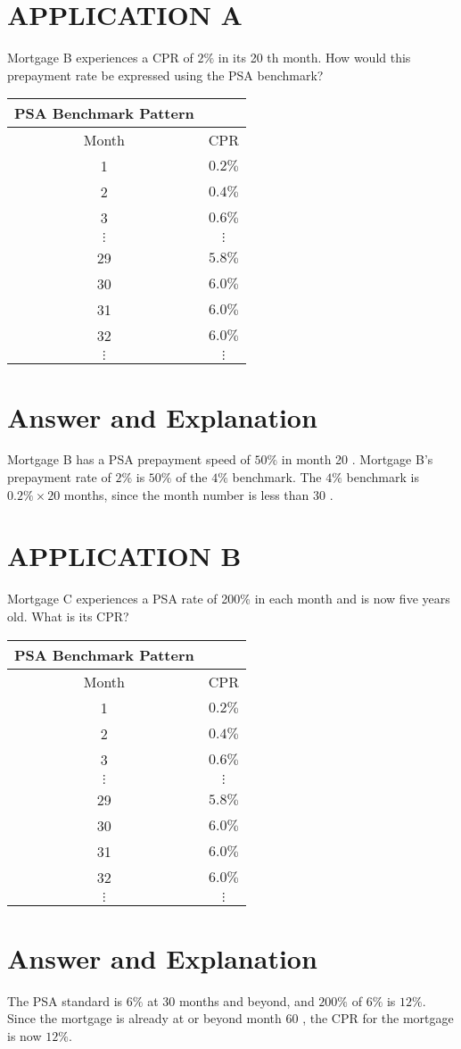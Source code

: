 \documentclass[11pt]{article}
\begin{document}
\section*{APPLICATION A}
Mortgage B experiences a CPR of $2 \%$ in its 20 th month. How would this prepayment rate be expressed using the PSA benchmark?

\begin{center}
\begin{tabular}{|cc|}
\hline
PSA Benchmark Pattern &  \\
\hline
Month & CPR \\
\hline
1 & $0.2 \%$ \\
2 & $0.4 \%$ \\
3 & $0.6 \%$ \\
$\vdots$ & $\vdots$ \\
29 & $5.8 \%$ \\
30 & $6.0 \%$ \\
31 & $6.0 \%$ \\
32 & $6.0 \%$ \\
$\vdots$ & $\vdots$ \\
\hline
\end{tabular}
\end{center}

\section*{Answer and Explanation}
Mortgage B has a PSA prepayment speed of $50 \%$ in month 20 . Mortgage B's prepayment rate of $2 \%$ is $50 \%$ of the $4 \%$ benchmark. The $4 \%$ benchmark is $0.2 \% \times 20$ months, since the month number is less than 30 .

\section*{APPLICATION B}
Mortgage C experiences a PSA rate of 200\% in each month and is now five years old. What is its CPR?

\begin{center}
\begin{tabular}{|cc|}
\hline
PSA Benchmark Pattern &  \\
\hline
Month & CPR \\
\hline
1 & $0.2 \%$ \\
2 & $0.4 \%$ \\
3 & $0.6 \%$ \\
$\vdots$ & $\vdots$ \\
29 & $5.8 \%$ \\
30 & $6.0 \%$ \\
31 & $6.0 \%$ \\
32 & $6.0 \%$ \\
$\vdots$ & $\vdots$ \\
\hline
\end{tabular}
\end{center}

\section*{Answer and Explanation}
The PSA standard is $6 \%$ at 30 months and beyond, and $200 \%$ of $6 \%$ is $12 \%$. Since the mortgage is already at or beyond month 60 , the CPR for the mortgage is now $12 \%$.
\end{document}
